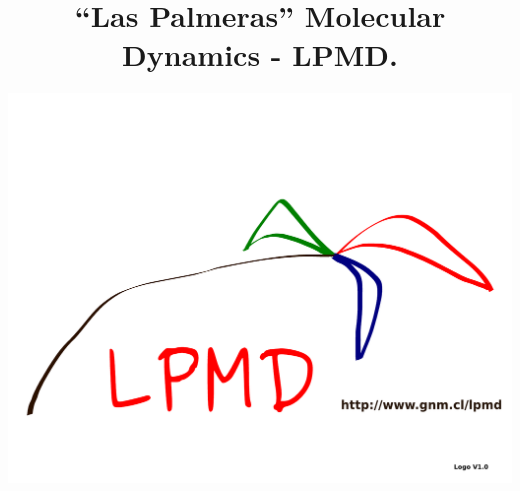 \documentclass[a4paper,10pt]{scrbook}
\begin{document}
\author{\includegraphics[scale=.35]{logo-lpmd.pdf}}
\title{``Las Palmeras'' Molecular Dynamics - \textbf{LPMD}.}
\maketitle
\end{document}

